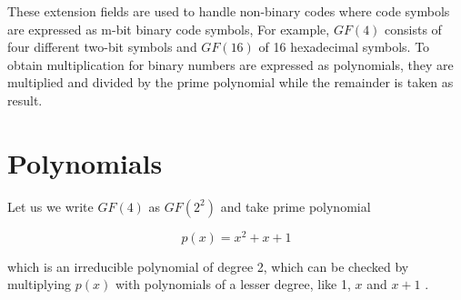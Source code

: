 \documentclass[../main.tex]{subfiles}
\begin{document}
    These extension fields are used to handle non-binary codes where code symbols are expressed as m-bit binary code symbols, For example, ${GF(4)}$ consists of four different two-bit symbols and ${GF(16)}$ of 16 hexadecimal symbols. To obtain multiplication for binary numbers are expressed as polynomials, they are multiplied and divided by the prime polynomial while the remainder is taken as result.


    \section{Polynomials}
    Let us we write ${GF(4)}$ as ${GF(2^2)}$ and take prime polynomial

    \begin{equation*}
        p(x) = x^2 + x + 1
    \end{equation*}

    \noindent
    which is an irreducible polynomial of degree 2, which can be checked by multiplying ${p(x)}$ with polynomials of a lesser degree, like 1, ${x}$ and ${x+1}$ \autocite{blahut1983theory}.
\end{document}
